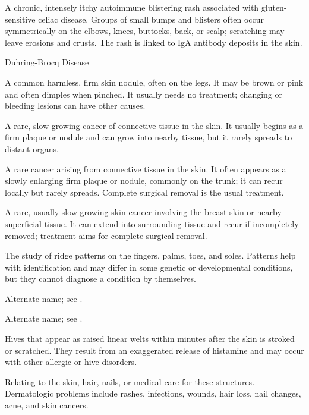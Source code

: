  A chronic, intensely itchy autoimmune blistering rash associated with
gluten-sensitive celiac disease. Groups of small bumps and blisters often occur symmetrically
on the elbows, knees, buttocks, back, or scalp; scratching may leave erosions and crusts.
The rash is linked to IgA antibody deposits in the skin.

\synonyms
Duhring-Brocq Disease

 A common harmless, firm skin nodule, often on the legs. It may be brown or pink and often dimples when pinched. It usually needs no treatment; changing or bleeding lesions can have other causes.

 A rare, slow-growing cancer of connective tissue in the skin. It usually begins as a firm plaque or nodule and can grow into nearby tissue, but it rarely spreads to distant organs.

 A rare cancer arising from connective tissue in the skin. It often appears as a slowly enlarging firm plaque or nodule, commonly on the trunk; it can recur locally but rarely spreads. Complete surgical removal is the usual treatment.



 A rare, usually slow-growing skin cancer involving the breast skin or nearby superficial tissue. It can extend into surrounding tissue and recur if incompletely removed; treatment aims for complete surgical removal.

 The study of ridge patterns on the fingers, palms, toes, and soles. Patterns help with identification and may differ in some genetic or developmental conditions, but they cannot diagnose a condition by themselves.

 Alternate name; see .

 Alternate name; see .

 Hives that appear as raised linear welts within minutes after the skin is stroked or scratched. They result from an exaggerated release of histamine and may occur with other allergic or hive disorders.

 Relating to the skin, hair, nails, or medical care for these structures. Dermatologic problems include rashes, infections, wounds, hair loss, nail changes, acne, and skin cancers.

